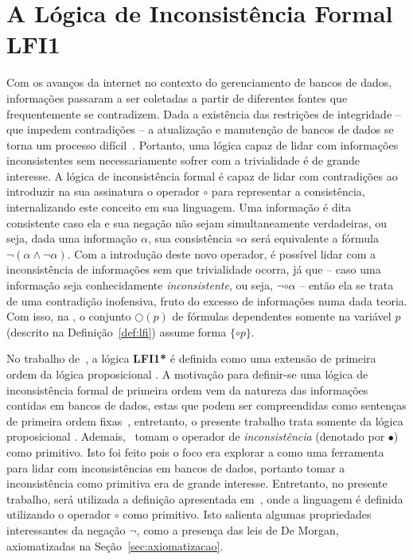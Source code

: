 \chapter{A Lógica de Inconsistência Formal LFI1}\label{cap:LFI1}

Com os avanços da internet no contexto do gerenciamento de bancos de dados, informações passaram a ser coletadas a partir de diferentes fontes que frequentemente se contradizem. Dada a existência das restrições de integridade {--} que impedem contradições {--} a atualização e manutenção de bancos de dados se torna um processo difícil~\cite{carnielli2000formal}. Portanto, uma lógica capaz de lidar com informações inconsistentes sem necessariamente sofrer com a trivialidade é de grande interesse. A lógica de inconsistência formal \lfium{} é capaz de lidar com contradições ao introduzir na sua assinatura o operador $\circ$ para representar a consistência, internalizando este conceito em sua linguagem. Uma informação é dita consistente caso ela e sua negação não sejam simultaneamente verdadeiras, ou seja, dada uma informação $\alpha$, sua consistência $\circ \alpha$ será equivalente a fórmula $\neg (\alpha \land \neg \alpha)$. Com a introdução deste novo operador, é possível lidar com a inconsistência de informações sem que trivialidade ocorra, já que {--} caso uma informação seja conhecidamente \textit{inconsistente}, ou seja, $\neg \circ \alpha$ {--} então ela se trata de uma contradição inofensiva, fruto do excesso de informações numa dada teoria. Com isso, na \lfium{}, o conjunto $\bigcirc(p)$ de fórmulas dependentes somente na variável $p$ (descrito na Definição~\ref{def:lfi}) assume forma $\{\circ p\}$.

No trabalho de~, a lógica \textbf{LFI1*} é definida como uma extensão de primeira ordem da lógica proposicional \lfium{}. A motivação para definir-se uma lógica de inconsistência formal de primeira ordem vem da natureza das informações contidas em bancos de dados, estas que podem ser compreendidas como sentenças de primeira ordem fixas~\cite{Codd}, entretanto, o presente trabalho trata somente da lógica proposicional \lfium{}. Ademais,~ tomam o operador de \textit{inconsistência} (denotado por $\bullet$) como primitivo. Isto foi feito pois o foco era explorar a \lfium{} como uma ferramenta para lidar com inconsistências em bancos de dados, portanto tomar a inconsistência como primitiva era de grande interesse. Entretanto, no presente trabalho, será utilizada a definição apresentada em~, onde a linguagem é definida utilizando o operador $\circ$ como primitivo. Isto salienta algumas propriedades interessantes da negação $\neg$, como a presença das leis de De Morgan, axiomatizadas na Seção~\ref{sec:axiomatizacao}.


